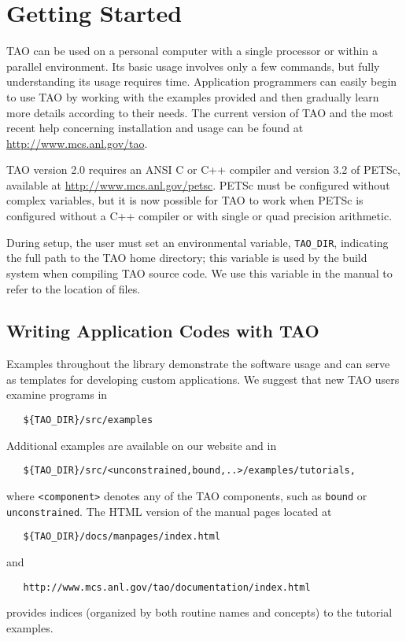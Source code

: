 \chapter{Getting Started}
\label{chapter:intro_tao}

TAO can be used on a personal
computer with a single processor or within a parallel environment.  
Its basic usage involves only a few commands, but fully 
understanding its usage requires time.
Application programmers can easily begin to use TAO by working with 
the examples provided and then gradually learn more details according to
their needs.  The current version of TAO and the most recent help 
concerning installation and usage can be found at  
\url{http://www.mcs.anl.gov/tao}.

TAO version 2.0 requires an ANSI C or C++ compiler and version 3.2 of PETSc, 
available at \url{http://www.mcs.anl.gov/petsc}.  PETSc must be configured 
without complex variables, but it is now possible for TAO to work when PETSc 
is configured without a C++ compiler or with single or quad precision 
arithmetic.

During setup, the user must set an environmental variable, 
\texttt{TAO\_DIR}, indicating the full path to 
the TAO home directory; this variable is used by the build
system when compiling TAO source code.  We use this variable in the
manual to refer to the location of files.

\section{Writing Application Codes with TAO}

Examples throughout the library demonstrate the software usage and
can serve as templates for developing custom applications.  We suggest
that new TAO users examine programs in
\begin{verbatim}
   ${TAO_DIR}/src/examples
\end{verbatim} %
\noindent
Additional examples are available on our website and in
\begin{verbatim}
   ${TAO_DIR}/src/<unconstrained,bound,..>/examples/tutorials,
\end{verbatim} 
\noindent
where \texttt{<component>}
denotes any of the TAO components, such as 
\texttt{bound} or \texttt{unconstrained}.
The HTML version of the manual pages located at
\begin{verbatim}
   ${TAO_DIR}/docs/manpages/index.html
\end{verbatim} %
\noindent
and
\begin{verbatim}
   http://www.mcs.anl.gov/tao/documentation/index.html
\end{verbatim}
\noindent
provides indices (organized by both routine names and concepts) to the
tutorial examples.

